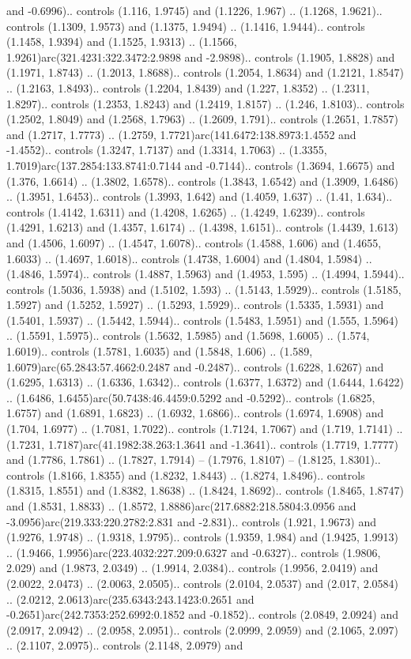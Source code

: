 and -0.6996).. controls (1.116, 1.9745) and (1.1226, 1.967) .. (1.1268, 1.9621).. controls (1.1309, 1.9573) and (1.1375, 1.9494) .. (1.1416, 1.9444).. controls (1.1458, 1.9394) and (1.1525, 1.9313) .. (1.1566, 1.9261)arc(321.4231:322.3472:2.9898 and -2.9898).. controls (1.1905, 1.8828) and (1.1971, 1.8743) .. (1.2013, 1.8688).. controls (1.2054, 1.8634) and (1.2121, 1.8547) .. (1.2163, 1.8493).. controls (1.2204, 1.8439) and (1.227, 1.8352) .. (1.2311, 1.8297).. controls (1.2353, 1.8243) and (1.2419, 1.8157) .. (1.246, 1.8103).. controls (1.2502, 1.8049) and (1.2568, 1.7963) .. (1.2609, 1.791).. controls (1.2651, 1.7857) and (1.2717, 1.7773) .. (1.2759, 1.7721)arc(141.6472:138.8973:1.4552 and -1.4552).. controls (1.3247, 1.7137) and (1.3314, 1.7063) .. (1.3355, 1.7019)arc(137.2854:133.8741:0.7144 and -0.7144).. controls (1.3694, 1.6675) and (1.376, 1.6614) .. (1.3802, 1.6578).. controls (1.3843, 1.6542) and (1.3909, 1.6486) .. (1.3951, 1.6453).. controls (1.3993, 1.642) and (1.4059, 1.637) .. (1.41, 1.634).. controls (1.4142, 1.6311) and (1.4208, 1.6265) .. (1.4249, 1.6239).. controls (1.4291, 1.6213) and (1.4357, 1.6174) .. (1.4398, 1.6151).. controls (1.4439, 1.613) and (1.4506, 1.6097) .. (1.4547, 1.6078).. controls (1.4588, 1.606) and (1.4655, 1.6033) .. (1.4697, 1.6018).. controls (1.4738, 1.6004) and (1.4804, 1.5984) .. (1.4846, 1.5974).. controls (1.4887, 1.5963) and (1.4953, 1.595) .. (1.4994, 1.5944).. controls (1.5036, 1.5938) and (1.5102, 1.593) .. (1.5143, 1.5929).. controls (1.5185, 1.5927) and (1.5252, 1.5927) .. (1.5293, 1.5929).. controls (1.5335, 1.5931) and (1.5401, 1.5937) .. (1.5442, 1.5944).. controls (1.5483, 1.5951) and (1.555, 1.5964) .. (1.5591, 1.5975).. controls (1.5632, 1.5985) and (1.5698, 1.6005) .. (1.574, 1.6019).. controls (1.5781, 1.6035) and (1.5848, 1.606) .. (1.589, 1.6079)arc(65.2843:57.4662:0.2487 and -0.2487).. controls (1.6228, 1.6267) and (1.6295, 1.6313) .. (1.6336, 1.6342).. controls (1.6377, 1.6372) and (1.6444, 1.6422) .. (1.6486, 1.6455)arc(50.7438:46.4459:0.5292 and -0.5292).. controls (1.6825, 1.6757) and (1.6891, 1.6823) .. (1.6932, 1.6866).. controls (1.6974, 1.6908) and (1.704, 1.6977) .. (1.7081, 1.7022).. controls (1.7124, 1.7067) and (1.719, 1.7141) .. (1.7231, 1.7187)arc(41.1982:38.263:1.3641 and -1.3641).. controls (1.7719, 1.7777) and (1.7786, 1.7861) .. (1.7827, 1.7914) -- (1.7976, 1.8107) -- (1.8125, 1.8301).. controls (1.8166, 1.8355) and (1.8232, 1.8443) .. (1.8274, 1.8496).. controls (1.8315, 1.8551) and (1.8382, 1.8638) .. (1.8424, 1.8692).. controls (1.8465, 1.8747) and (1.8531, 1.8833) .. (1.8572, 1.8886)arc(217.6882:218.5804:3.0956 and -3.0956)arc(219.333:220.2782:2.831 and -2.831).. controls (1.921, 1.9673) and (1.9276, 1.9748) .. (1.9318, 1.9795).. controls (1.9359, 1.984) and (1.9425, 1.9913) .. (1.9466, 1.9956)arc(223.4032:227.209:0.6327 and -0.6327).. controls (1.9806, 2.029) and (1.9873, 2.0349) .. (1.9914, 2.0384).. controls (1.9956, 2.0419) and (2.0022, 2.0473) .. (2.0063, 2.0505).. controls (2.0104, 2.0537) and (2.017, 2.0584) .. (2.0212, 2.0613)arc(235.6343:243.1423:0.2651 and -0.2651)arc(242.7353:252.6992:0.1852 and -0.1852).. controls (2.0849, 2.0924) and (2.0917, 2.0942) .. (2.0958, 2.0951).. controls (2.0999, 2.0959) and (2.1065, 2.097) .. (2.1107, 2.0975).. controls (2.1148, 2.0979) and 